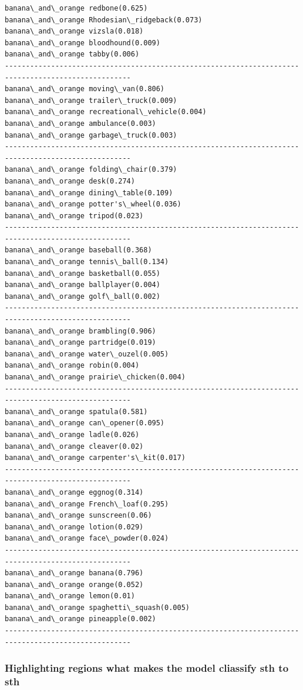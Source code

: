 \documentclass[11pt]{article}
\begin{document}
    \begin{Verbatim}[commandchars=\\\{\}]
banana\_and\_orange	redbone(0.625)
banana\_and\_orange	Rhodesian\_ridgeback(0.073)
banana\_and\_orange	vizsla(0.018)
banana\_and\_orange	bloodhound(0.009)
banana\_and\_orange	tabby(0.006)
----------------------------------------------------------------------------------------------------
banana\_and\_orange	moving\_van(0.806)
banana\_and\_orange	trailer\_truck(0.009)
banana\_and\_orange	recreational\_vehicle(0.004)
banana\_and\_orange	ambulance(0.003)
banana\_and\_orange	garbage\_truck(0.003)
----------------------------------------------------------------------------------------------------
banana\_and\_orange	folding\_chair(0.379)
banana\_and\_orange	desk(0.274)
banana\_and\_orange	dining\_table(0.109)
banana\_and\_orange	potter's\_wheel(0.036)
banana\_and\_orange	tripod(0.023)
----------------------------------------------------------------------------------------------------
banana\_and\_orange	baseball(0.368)
banana\_and\_orange	tennis\_ball(0.134)
banana\_and\_orange	basketball(0.055)
banana\_and\_orange	ballplayer(0.004)
banana\_and\_orange	golf\_ball(0.002)
----------------------------------------------------------------------------------------------------
banana\_and\_orange	brambling(0.906)
banana\_and\_orange	partridge(0.019)
banana\_and\_orange	water\_ouzel(0.005)
banana\_and\_orange	robin(0.004)
banana\_and\_orange	prairie\_chicken(0.004)
----------------------------------------------------------------------------------------------------
banana\_and\_orange	spatula(0.581)
banana\_and\_orange	can\_opener(0.095)
banana\_and\_orange	ladle(0.026)
banana\_and\_orange	cleaver(0.02)
banana\_and\_orange	carpenter's\_kit(0.017)
----------------------------------------------------------------------------------------------------
banana\_and\_orange	eggnog(0.314)
banana\_and\_orange	French\_loaf(0.295)
banana\_and\_orange	sunscreen(0.06)
banana\_and\_orange	lotion(0.029)
banana\_and\_orange	face\_powder(0.024)
----------------------------------------------------------------------------------------------------
banana\_and\_orange	banana(0.796)
banana\_and\_orange	orange(0.052)
banana\_and\_orange	lemon(0.01)
banana\_and\_orange	spaghetti\_squash(0.005)
banana\_and\_orange	pineapple(0.002)
----------------------------------------------------------------------------------------------------

    \end{Verbatim}

    \subsubsection{Highlighting regions what makes the model cliassify sth
to
sth}\label{highlighting-regions-what-makes-the-model-cliassify-sth-to-sth}
\end{document}
